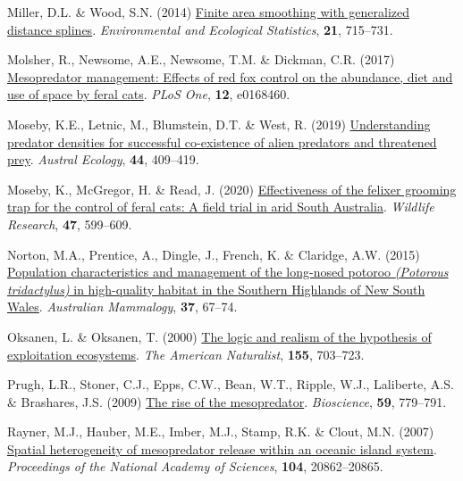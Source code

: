\documentclass[preprint, 3p, authoryear]{elsarticle} %
\newlength{\cslhangindent}
\newlength{\cslentryspacingunit} %
\newenvironment{CSLReferences}[2] %
 {%
  \setlength{\parindent}{0pt}
  \ifodd #1
  \let\oldpar\par
  \def\par{\hangindent=\cslhangindent\oldpar}
  \fi
  \setlength{\parskip}{#2\cslentryspacingunit}
 }%
 {}
\begin{document}
\begin{CSLReferences}{1}{0}
\leavevmode{}%
Miller, D.L. \& Wood, S.N. (2014) \href{https://doi.org/10.1007/s10651-014-0277-4}{Finite area smoothing with generalized distance splines}. \emph{Environmental and Ecological Statistics}, \textbf{21}, 715--731.

\leavevmode{}%
Molsher, R., Newsome, A.E., Newsome, T.M. \& Dickman, C.R. (2017) \href{https://doi.org/10.1371/journal.pone.0168460}{Mesopredator management: Effects of red fox control on the abundance, diet and use of space by feral cats}. \emph{PLoS One}, \textbf{12}, e0168460.

\leavevmode{}%
Moseby, K.E., Letnic, M., Blumstein, D.T. \& West, R. (2019) \href{https://doi.org/10.1111/aec.12697}{Understanding predator densities for successful co-existence of alien predators and threatened prey}. \emph{Austral Ecology}, \textbf{44}, 409--419.

\leavevmode{}%
Moseby, K., McGregor, H. \& Read, J. (2020) \href{https://doi.org/10.1071/WR19132}{Effectiveness of the felixer grooming trap for the control of feral cats: A field trial in arid {South {A}ustralia}}. \emph{Wildlife Research}, \textbf{47}, 599--609.

\leavevmode{}%
Norton, M.A., Prentice, A., Dingle, J., French, K. \& Claridge, A.W. (2015) \href{https://doi.org/10.1071/AM14026}{Population characteristics and management of the long-nosed potoroo \emph{({Potorous tridactylus})} in high-quality habitat in the {Southern Highlands of New South Wales}}. \emph{Australian Mammalogy}, \textbf{37}, 67--74.

\leavevmode{}%
Oksanen, L. \& Oksanen, T. (2000) \href{https://doi.org/10.1086/303354}{The logic and realism of the hypothesis of exploitation ecosystems}. \emph{The American Naturalist}, \textbf{155}, 703--723.

\leavevmode{}%
Prugh, L.R., Stoner, C.J., Epps, C.W., Bean, W.T., Ripple, W.J., Laliberte, A.S. \& Brashares, J.S. (2009) \href{https://doi.org/10.1525/bio.2009.59.9.9}{The rise of the mesopredator}. \emph{Bioscience}, \textbf{59}, 779--791.

\leavevmode{}%
Rayner, M.J., Hauber, M.E., Imber, M.J., Stamp, R.K. \& Clout, M.N. (2007) \href{https://doi.org/10.1073/pnas.0707414105}{Spatial heterogeneity of mesopredator release within an oceanic island system}. \emph{Proceedings of the National Academy of Sciences}, \textbf{104}, 20862--20865.


\end{CSLReferences}
\end{document}
